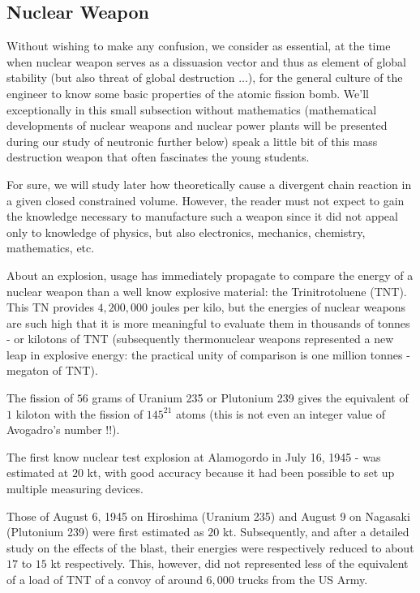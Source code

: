 	\subsection{Nuclear Weapon}
	Without wishing to make any confusion, we consider as essential, at the time when nuclear weapon serves as a dissuasion vector and thus as element of global stability (but also threat of global destruction ...), for the general culture of the engineer to know some basic properties of the atomic fission bomb. We'll exceptionally in this small subsection without mathematics (mathematical developments of nuclear weapons and nuclear power plants will be presented during our study of neutronic further below) speak a little bit of this mass destruction weapon that often fascinates the young students.
	
	For sure, we will study later how theoretically cause a divergent chain reaction in a given closed constrained volume. However, the reader must not expect to gain the knowledge necessary to manufacture such a weapon since it did not appeal only to knowledge of physics, but also electronics, mechanics, chemistry, mathematics, etc.
	
	About an explosion, usage has immediately propagate to compare the energy of a nuclear weapon than a well know explosive material: the Trinitrotoluene (TNT). This TN provides $4,200,000$ joules per kilo, but the energies of nuclear weapons are such high that it is more meaningful to evaluate them in thousands of tonnes - or kilotons of TNT (subsequently thermonuclear weapons represented a new leap in explosive energy: the practical unity of comparison is one million tonnes - megaton of TNT).
	
	The fission of $56$ grams of Uranium 235 or Plutonium 239 gives the equivalent of $1$ kiloton with the fission of $145^{21}$ atoms (this is not even an integer value of Avogadro's number !!).
	
	The first know nuclear test explosion at Alamogordo in July 16, 1945 - was estimated at $20$ kt, with good accuracy because it had been possible to set up multiple measuring devices.
	
	Those of August 6, 1945 on Hiroshima (Uranium 235) and August 9 on Nagasaki (Plutonium 239) were first estimated as $20$ kt. Subsequently, and after a detailed study on the effects of the blast, their energies were respectively reduced to about $17$ to $15$ kt respectively. This, however, did not represented less of the equivalent of a load of TNT of a convoy of around $6,000$ trucks from the US Army.
	
